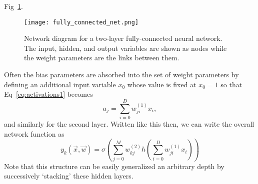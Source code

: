 \documentclass[../main.tex]{subfiles}
\begin{document}
Fig~\ref{fig:fully_connected_net}.
%
\begin{figure}[htbp]
  \centering
  \texttt{[image: fully\_connected\_net.png]}
  \caption{Network diagram for a two-layer fully-connected neural network. The
  input, hidden, and output variables are shown as nodes while the weight
parameters are the links between them.}%
\label{fig:fully_connected_net}
\end{figure}
%
Often the bias parameters are absorbed into the set of weight parameters by
defining an additional input variable $x_{0}$ whose value is fixed at $x_{0} =
1$ so that Eq~\ref{eq:activations1} becomes
%
\begin{equation}
  a_{j} = \sum_{i=0}^{D} w_{ji}^{(1)} x_{i},
\end{equation}
%
and similarly for the second layer.
%
Written like this then, we can write the overall network function as
%
\begin{equation}
  y_{k}{(\vec{x}, \vec{w})} = \sigma{\left(\sum_{j=0}^{M}w_{kj}^{(2)}
    h{\left(\sum_{i=0}^{D}w_{ji}^{(1)}x_{i}\right)}\right)}
\end{equation}
%
Note that this structure can be easily generalized an arbitrary depth by
successively `stacking' these hidden layers.
%
\end{document}
